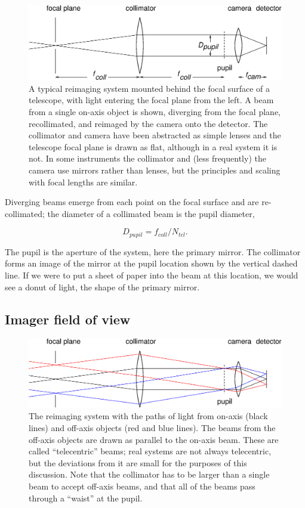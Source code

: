 \documentclass[12pt]{article}
\begin{document}
\begin{figure}[ht]
\centerline{
\includegraphics[width=5.5truein]{onaxisbeam2.eps}
}
\caption{A typical reimaging system mounted behind the
focal surface of a telescope, with light entering the
focal plane from the left.  A beam from a single on-axis
object is shown, diverging from the focal plane, recollimated,
and reimaged by the camera onto the detector.
The collimator and camera
have been abstracted as simple lenses and the telescope focal plane
is drawn as flat, although in a real system it is not.
In some instruments the collimator and (less frequently) the
camera use mirrors rather than lenses, but the principles
and scaling with focal lengths are similar.
}
\label{fig-reimager}
\end{figure}

Diverging beams emerge from each point on the focal surface
and are re-collimated; the diameter of a collimated beam is
the pupil diameter,

$$ D_{pupil} = f_{coll} / N_{tel}.$$

The pupil is the aperture of the system, here the primary mirror.
The collimator forms an image of the mirror at the pupil location
shown by the vertical dashed line.  If we were to put a sheet
of paper into the beam at this location, we would see a donut
of light, the shape of the primary mirror.

\subsection{Imager field of view}

\begin{figure}[ht]
\centerline{
\includegraphics[width=5.5truein]{offaxisbeams.eps}
}
\caption{The reimaging system with the paths of light
from on-axis (black lines) and off-axis objects (red and blue lines).  The 
beams from the off-axis objects are drawn as parallel
to the on-axis beam.  These are called ``telecentric'' beams;
real systems are not always telecentric, but the deviations
from it are small for the purposes of this discussion.
Note that the collimator has to be larger than a single 
beam to accept off-axis beams, and that all of the beams
pass through a ``waist'' at the pupil.  
}
\label{fig-offaxis}
\end{figure}
\end{document}
